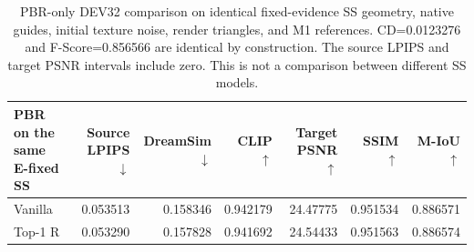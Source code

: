 \begin{table}[t]
\centering\scriptsize
\begin{tabular}{lrrrrrr}
\toprule
PBR on the same E-fixed SS&Source LPIPS$\downarrow$&DreamSim$\downarrow$&CLIP$\uparrow$&Target PSNR$\uparrow$&SSIM$\uparrow$&M-IoU$\uparrow$\\
\midrule
Vanilla&0.053513&0.158346&0.942179&24.47775&0.951534&0.886571\\
Top-1 R&0.053290&0.157828&0.941692&24.54433&0.951563&0.886574\\
\bottomrule
\end{tabular}
\caption{PBR-only DEV32 comparison on identical fixed-evidence SS geometry, native guides, initial texture noise, render triangles, and M1 references. CD=0.0123276 and F-Score=0.856566 are identical by construction. The source LPIPS and target PSNR intervals include zero. This is not a comparison between different SS models.}
\label{tab:paired-pbr32}
\end{table}
